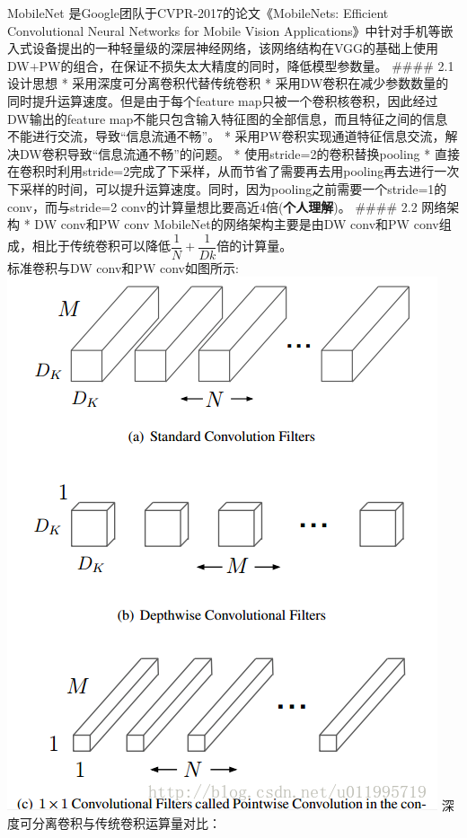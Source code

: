 MobileNet 是Google团队于CVPR-2017的论文《MobileNets: Efficient
Convolutional Neural Networks for Mobile Vision
Applications》中针对手机等嵌入式设备提出的一种轻量级的深层神经网络，该网络结构在VGG的基础上使用DW+PW的组合，在保证不损失太大精度的同时，降低模型参数量。
\#\#\#\# 2.1 设计思想 * 采用深度可分离卷积代替传统卷积 *
采用DW卷积在减少参数数量的同时提升运算速度。但是由于每个feature
map只被一个卷积核卷积，因此经过DW输出的feature
map不能只包含输入特征图的全部信息，而且特征之间的信息不能进行交流，导致``信息流通不畅''。
* 采用PW卷积实现通道特征信息交流，解决DW卷积导致``信息流通不畅''的问题。
* 使用stride=2的卷积替换pooling *
直接在卷积时利用stride=2完成了下采样，从而节省了需要再去用pooling再去进行一次下采样的时间，可以提升运算速度。同时，因为pooling之前需要一个stride=1的
conv，而与stride=2 conv的计算量想比要高近4倍(\textbf{个人理解})。
\#\#\#\# 2.2 网络架构 * DW conv和PW conv MobileNet的网络架构主要是由DW
conv和PW
conv组成，相比于传统卷积可以降低\(\dfrac{1}{N} + \dfrac{1}{Dk}​\)倍的计算量。\\
标准卷积与DW conv和PW conv如图所示:\\
\includegraphics{./img/ch17/12.png} 深度可分离卷积与传统卷积运算量对比：
